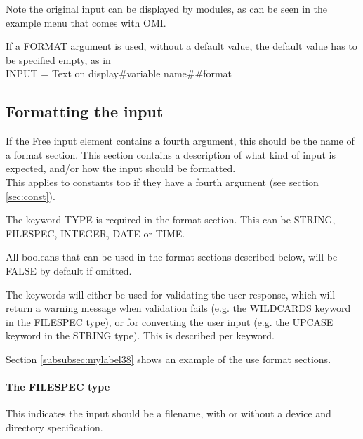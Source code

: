 \documentclass[a4paper]{book}
\newcommand{\vs}{\vspace{3mm}}
\renewcommand{\indent}{\hspace*{5mm}}
\begin{document}
Note the original input can be displayed by modules, as can be seen in the example menu that comes with OMI.

\vs

If a FORMAT argument is used, without a default value, the default value has 
to be specified empty, as in \\
\indent\textsf{INPUT = Text on display{\#}variable name{\#}{\#}format}

\subsection{Formatting the input}
\label{subsubsec:formatting}

If the Free input element contains a fourth argument, this should be the 
name of a format section. This section contains a description of what kind of
input is expected, and/or how the input should be formatted.\\
This applies to constants too if they have a fourth argument (see section \ref{sec:const}).

\vs

The keyword \textsf{TYPE} is required in the format section. This can be \textsf{STRING}, 
\textsf{FILESPEC}, \textsf{INTEGER}, \textsf{DATE} or \textsf{TIME}.

All booleans that can be used in the format sections described below, will 
be \textsf{FALSE} by default if omitted.

\vs

The keywords will either be used for validating the user response, which 
will return a warning message when validation fails (e.g. the \textsf{WILDCARDS} 
keyword in the \textsf{FILESPEC} type), 
or for converting the user input (e.g. the \textsf{UPCASE} keyword in the \textsf{STRING} 
type). This is described per 
keyword.

Section \ref{subsubsec:mylabel38} shows an example of the use format sections.

\paragraph{The FILESPEC type}

This indicates the input should be a filename, with or without a device and 
directory specification.
\end{document}

